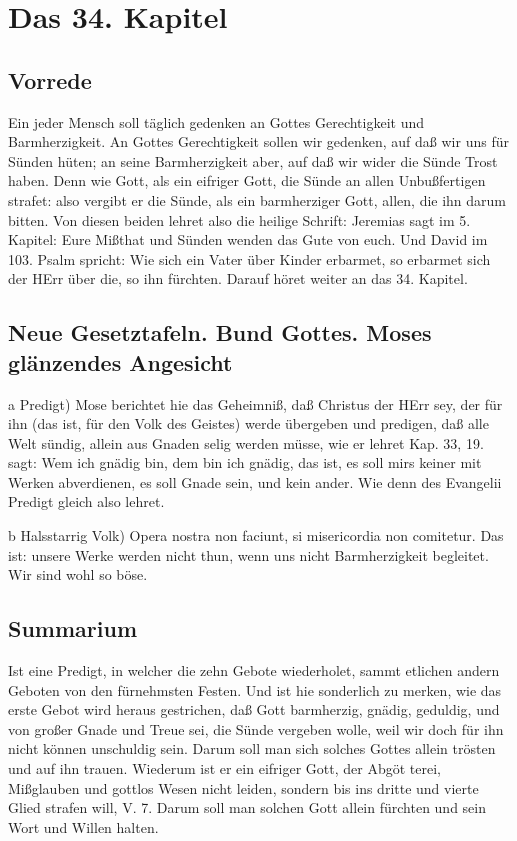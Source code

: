 \chapter{Das 34. Kapitel}

\section{Vorrede}

Ein jeder Mensch soll täglich gedenken an Gottes Gerechtigkeit und Barmherzigkeit. An Gottes Gerechtigkeit sollen wir gedenken, auf daß wir uns für Sünden hüten; an seine Barmherzigkeit aber, auf daß wir wider die Sünde Trost haben. Denn wie Gott, als ein eifriger Gott, die Sünde an allen Unbußfertigen strafet: also vergibt er die Sünde, als ein barmherziger Gott, allen, die ihn darum bitten. Von diesen beiden lehret also die heilige Schrift: Jeremias sagt im 5. Kapitel: Eure Mißthat und Sünden wenden das Gute von euch. Und David im 103. Psalm spricht: Wie sich ein Vater über Kinder erbarmet, so erbarmet sich der HErr über die, so ihn fürchten. Darauf höret weiter an das 34. Kapitel.

\section{Neue Gesetztafeln. Bund Gottes. Moses glänzendes Angesicht}

a Predigt) Mose berichtet hie das Geheimniß, daß Christus der HErr sey, der für ihn (das ist, für den Volk des Geistes) werde übergeben und predigen, daß alle Welt sündig, allein aus Gnaden selig werden müsse, wie er lehret Kap. 33, 19. sagt: Wem ich gnädig bin, dem bin ich gnädig, das ist, es soll mirs keiner mit Werken abverdienen, es soll Gnade sein, und kein ander. Wie denn des Evangelii Predigt gleich also lehret.

b Halsstarrig Volk) Opera nostra non faciunt, si misericordia non comitetur. Das ist: unsere Werke werden nicht thun, wenn uns nicht Barmherzigkeit begleitet. Wir sind wohl so böse.

\section{Summarium}

Ist eine Predigt, in welcher die zehn Gebote wiederholet, sammt etlichen andern Geboten von den fürnehmsten Festen. Und ist hie sonderlich zu merken, wie das erste Gebot wird heraus gestrichen, daß Gott barmherzig, gnädig, geduldig, und von großer Gnade und Treue sei, die Sünde vergeben wolle, weil wir doch für ihn nicht können unschuldig sein. Darum soll man sich solches Gottes allein trösten und auf ihn trauen. Wiederum ist er ein eifriger Gott, der Abgöt%
terei,
Mißglauben und gottlos Wesen nicht leiden, sondern bis ins dritte und vierte Glied strafen will, V. 7. Darum soll man solchen Gott allein fürchten und sein Wort und Willen halten.

